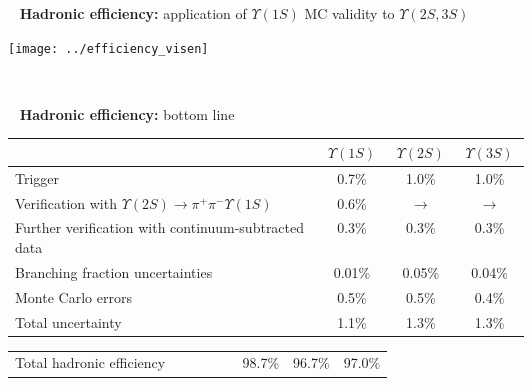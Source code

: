 \documentclass[landscape]{article}
\newenvironment{slide}{\mbox{ }\vfill}{\vfill \mbox{ } \pagebreak}
\begin{document}
\begin{slide}
{\bf Hadronic efficiency:} application of $\Upsilon(1S)$ MC validity to $\Upsilon(2S,3S)$

\vfill
\begin{center}
  \texttt{[image: ../efficiency\_visen]}
\end{center}
\end{slide}

\begin{slide}
{\bf Hadronic efficiency:} bottom line

\renewcommand{\arraystretch}{1.5}
\begin{center}
  \begin{tabular}{p{0.6\linewidth} c c c}
    & $\Upsilon(1S)$ & $\Upsilon(2S)$ & $\Upsilon(3S)$ \\\hline
    Trigger & 0.7\% & 1.0\% & 1.0\% \\
    Verification with $\Upsilon(2S) \to \pi^+\pi^- \Upsilon(1S)$ & 0.6\% & $\longrightarrow$ & $\longrightarrow$ \\
    Further verification with continuum-subtracted data & 0.3\% & 0.3\% & 0.3\% \\
    Branching fraction uncertainties & 0.01\% & 0.05\% & 0.04\% \\
    Monte Carlo errors & 0.5\% & 0.5\% & 0.4\% \\\hline
    Total uncertainty & 1.1\% & 1.3\% & 1.3\%
  \end{tabular}

  \vfill
  \begin{tabular}{p{0.6\linewidth} c c c}
    Total hadronic efficiency & 98.7\% & 96.7\% & 97.0\%
  \end{tabular}
\end{center}

\vfill
\end{slide}



  
\end{document}
